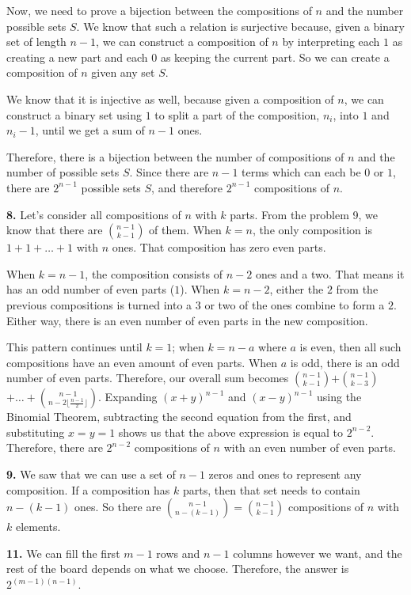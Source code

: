 \documentclass{article}
\begin{document}
Now, we need to prove a bijection between the compositions of $n$ and the number possible sets $S$. We know that such a relation is surjective because, given a binary set of length $n - 1$, we can construct a composition of $n$ by interpreting each $1$ as creating a new part and each $0$ as keeping the current part. So we can create a composition of $n$ given any set $S$.
\newline

We know that it is injective as well, because given a composition of $n$, we can construct a binary set using $1$ to split a part of the composition, $n_i$, into $1$ and $n_i - 1$, until we get a sum of $n - 1$ ones.
\newline

Therefore, there is a bijection between the number of compositions of $n$ and the number of possible sets $S$. Since there are $n - 1$ terms which can each be $0$ or $1$, there are $2^{n - 1}$ possible sets $S$, and therefore $2^{n - 1}$ compositions of $n$.
\newline

\textbf{8.} Let's consider all compositions of $n$ with $k$ parts. From the problem 9, we know that there are ${n - 1}\choose {k - 1}$ of them. When $k = n$, the only composition is $1 + 1 + \ldots + 1$ with $n$ ones. That composition has zero even parts.
\newline

When $k = n - 1$, the composition consists of $n - 2$ ones and a two. That means it has an odd number of even parts ($1$). When $k = n - 2$, either the $2$ from the previous compositions is turned into a $3$ or two of the ones combine to form a $2$. Either way, there is an even number of even parts in the new composition.
\newline

This pattern continues until $k = 1$; when $k = n - a$ where $a$ is even, then all such compositions have an even amount of even parts. When $a$ is odd, there is an odd number of even parts. Therefore, our overall sum becomes ${n - 1}\choose {k - 1}$$+$${n - 1}\choose {k - 3}$$+\ldots +$${n - 1}\choose {n - 2\lfloor \frac{n - 1}{2} \rfloor}$. Expanding $(x + y)^{n - 1}$ and $(x - y)^{n - 1}$ using the Binomial Theorem, subtracting the second equation from the first, and substituting $x = y = 1$ shows us that the above expression is equal to $2^{n - 2}$. Therefore, there are $2^{n - 2}$ compositions of $n$ with an even number of even parts.
\newline

\textbf{9.} We saw that we can use a set of $n - 1$ zeros and ones to represent any composition. If a composition has $k$ parts, then that set needs to contain $n - (k - 1)$ ones. So there are ${n - 1}\choose {n - (k - 1)}$$=$${n - 1}\choose {k - 1}$ compositions of $n$ with $k$ elements.
\newline

\textbf{11.} We can fill the first $m - 1$ rows and $n - 1$ columns however we want, and the rest of the board depends on what we choose.  Therefore, the answer is $2^{(m - 1)(n - 1)}$.
\newline
\end{document}
